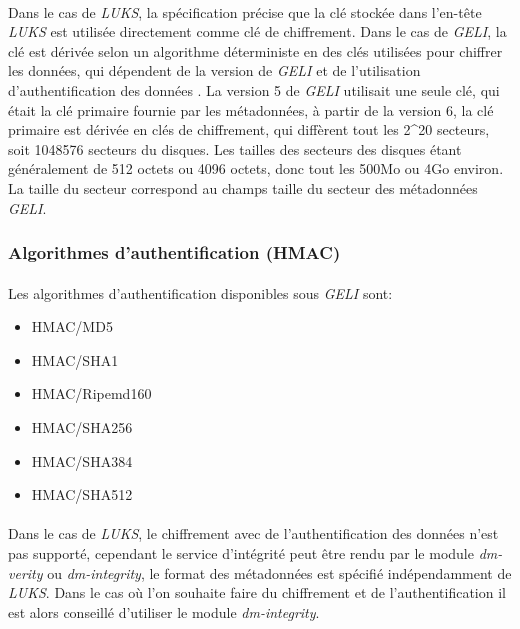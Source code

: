 \paragraph{}
Dans le cas de {\em LUKS}, la spécification \cite{onDiskFormatLuks} précise 
que la clé stockée dans l'en-tête {\em LUKS} est utilisée directement comme 
clé de chiffrement. Dans le cas de {\em GELI}, la clé est dérivée selon un 
algorithme déterministe en des clés utilisées pour chiffrer les données, 
qui dépendent de la version de {\em GELI} et de l'utilisation 
d'authentification des données \cite{manGeli}. 
La version 5 de {\em GELI} utilisait une seule clé, qui était la clé
primaire fournie par les métadonnées, à partir de la version 6, la clé primaire
est dérivée en clés de chiffrement, qui diffèrent tout les 2\textasciicircum20 
secteurs, soit 1048576 secteurs du disques. Les tailles des secteurs des 
disques étant généralement de 512 octets ou 4096 octets, 
donc tout les 500Mo ou 4Go environ.
La taille du secteur correspond au champs taille du secteur des métadonnées
{\em GELI}.

\subsubsection{Algorithmes d'authentification (HMAC)}
\paragraph{}
Les algorithmes d'authentification disponibles sous {\em GELI} sont:
\begin{itemize}
	\item HMAC/MD5
	\item HMAC/SHA1
	\item HMAC/Ripemd160
	\item HMAC/SHA256
	\item HMAC/SHA384
	\item HMAC/SHA512
\end{itemize}

\paragraph{}
Dans le cas de {\em LUKS}, le chiffrement avec de l'authentification des 
données n'est pas supporté, cependant le service d'intégrité peut être rendu 
par le module {\em dm-verity} ou {\em dm-integrity}, le format des métadonnées 
est spécifié indépendamment de {\em LUKS}. Dans le cas où l'on souhaite faire 
du chiffrement et de l'authentification il est alors conseillé d'utiliser le 
module {\em dm-integrity}.

